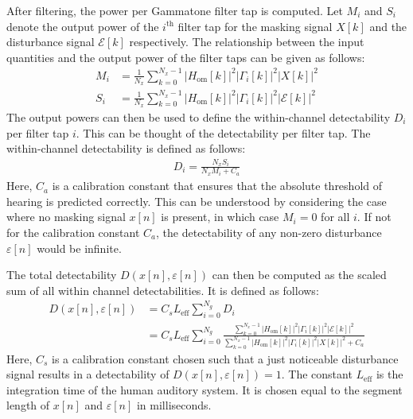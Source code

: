 After filtering, the power per Gammatone filter tap is computed.
Let $M_i$ and $S_i$ denote the output power of the $i^\text{th}$ filter tap for the masking signal $X[k]$ and 
the disturbance signal $\mathcal{E}[k]$ respectively.
The relationship between the input quantities and the output power of the filter taps can be given as follows:
\begin{align}
    M_i &= \frac{1}{N_x}\sum_{k=0}^{N_x-1}\left|H_\text{om}[k]\right|^2\left|\Gamma_i[k]\right|^2\left|X[k]\right|^2 \\
    S_i &= \frac{1}{N_x}\sum_{k=0}^{N_x-1}\left|H_\text{om}[k]\right|^2\left|\Gamma_i[k]\right|^2\left|\mathcal{E}[k]\right|^2 
\end{align}
The output powers can then be used to define the within-channel detectability $D_i$ per filter tap $i$.
This can be thought of the detectability per filter tap.
The within-channel detectability is defined as follows:
\begin{align}
    D_i = \frac{N_xS_i}{N_xM_i + C_a}
\end{align}
Here, $C_a$ is a calibration constant that ensures that the absolute threshold of hearing is predicted correctly.
This can be understood by considering the case where no masking signal $x[n]$ is present, 
in which case $M_i = 0$ for all $i$.
If not for the calibration constant $C_a$, the detectability of any non-zero disturbance $\varepsilon[n]$ would be infinite.

The total detectability $D(x[n],\varepsilon[n])$ can then be computed as the scaled sum of all within channel detectabilities.
It is defined as follows:
\begin{align}
    D(x[n],\varepsilon[n]) &= C_s L_\text{eff}\sum_{i=0}^{N_g} D_i \\
                        &= C_s L_\text{eff}\sum_{i=0}^{N_g} 
                        \frac{\sum_{k=0}^{N_x-1}\left|H_\text{om}[k]\right|^2\left|
                            \Gamma_i[k]\right|^2\left|\mathcal{E}[k]\right|^2}
                        {\sum_{k=0}^{N_x-1}\left|H_\text{om}[k]\right|^2\left|
                            \Gamma_i[k]\right|^2\left|X[k]\right|^2 + C_a}
    \label{eq:perceptual:implementation:computation:detectability}
\end{align}
Here, $C_s$ is a calibration constant chosen such that a just noticeable disturbance signal results in a 
detectability of $D(x[n],\varepsilon[n]) = 1$. 
The constant $L_\text{eff}$ is the integration time of the human auditory system.
It is chosen equal to the segment length of $x[n]$ and $\varepsilon[n]$ in milliseconds.  

